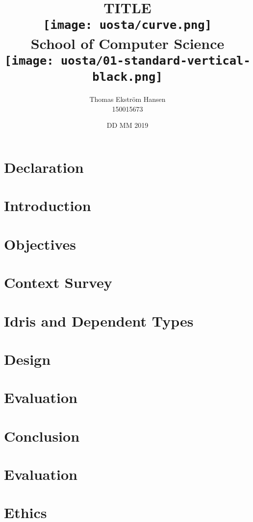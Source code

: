 \documentclass[12pt]{report}
\title{
    {TITLE}\\
    \vspace{2cm}
    {\texttt{[image: uosta/curve.png]}}\\
    {\fontfamily{ppl}\selectfont\large School of Computer Science}\\
    \vspace{-0.8cm}
    {\texttt{[image: uosta/01-standard-vertical-black.png]}}\\
    \vspace{-2cm}
}
\author{
    {Thomas Ekstr{\" o}m Hansen}\\
    {150015673}
}
\date{DD MM 2019}
\begin{document}
    \maketitle
    
    \chapter*{Declaration}
    
    
    \tableofcontents
    
    \chapter{Introduction}
    
    
    \chapter{Objectives}
    
    
    \chapter{Context Survey}
    
    
    \chapter{Idris and Dependent Types}
    
        
    \chapter{Design}
    
    
    \chapter{Evaluation}
    
        
    \chapter{Conclusion}
    
    
    
    
    
    \appendix
    
    \chapter{Evaluation}\label{app:evaln}
    
    
    \chapter{Ethics}
    
\end{document}

